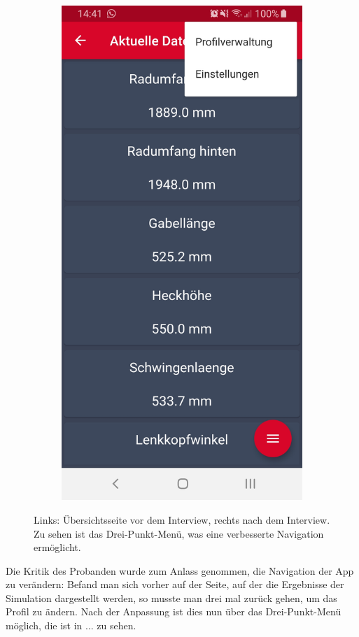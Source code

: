 \begin{figure}[H]
\begin{subfigure}[b]{0.45\textwidth}
		\end{subfigure}
		\hfill
		\begin{subfigure}[b]{0.45\textwidth}
			\includegraphics[width=1\textwidth]{../include/images/usertests/threepointmenu/after}
		\end{subfigure}
		\caption{Links: Übersichtsseite vor dem Interview, rechts nach dem Interview. Zu sehen ist das Drei-Punkt-Menü, was eine verbesserte Navigation ermöglicht.}
		\label{img:threepointmenu}
	\end{figure}

	Die Kritik des Probanden wurde zum Anlass genommen, die Navigation der App zu verändern: Befand man sich vorher auf der Seite, auf der die Ergebnisse der Simulation dargestellt werden, so musste man drei mal zurück gehen, um das Profil zu ändern. Nach der Anpassung ist dies nun über das Drei-Punkt-Menü möglich, die ist in ... zu sehen.